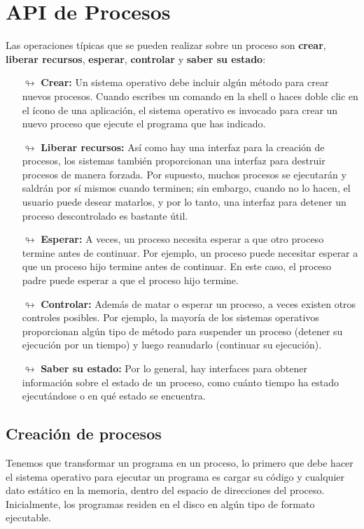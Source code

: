 \documentclass{article}
\begin{document}
\section{API de Procesos}
Las operaciones típicas que se pueden realizar sobre un proceso son \textbf{crear}, \textbf{liberar recursos}, \textbf{esperar}, \textbf{controlar} y \textbf{saber su estado}:
\begin{itemize}
    \item[$\looparrowright$] \textbf{Crear:} Un sistema operativo debe incluir algún método para crear nuevos procesos. Cuando escribes un comando en la shell o haces doble clic en el ícono de una aplicación, el sistema operativo es invocado para crear un nuevo proceso que ejecute el programa que has indicado.
    \item[$\looparrowright$] \textbf{Liberar recursos:} Así como hay una interfaz para la creación de procesos, los sistemas también proporcionan una interfaz para destruir procesos de manera forzada. Por supuesto, muchos procesos se ejecutarán y saldrán por sí mismos cuando terminen; sin embargo, cuando no lo hacen, el usuario puede desear matarlos, y por lo tanto, una interfaz para detener un proceso descontrolado es bastante útil.
    \item[$\looparrowright$] \textbf{Esperar:} A veces, un proceso necesita esperar a que otro proceso termine antes de continuar. Por ejemplo, un proceso puede necesitar esperar a que un proceso hijo termine antes de continuar. En este caso, el proceso padre puede esperar a que el proceso hijo termine.
    \item[$\looparrowright$] \textbf{Controlar:} Además de matar o esperar un proceso, a veces existen otros controles posibles. Por ejemplo, la mayoría de los sistemas operativos proporcionan algún tipo de método para suspender un proceso (detener su ejecución por un tiempo) y luego reanudarlo (continuar su ejecución).
    \item[$\looparrowright$] \textbf{Saber su estado:} Por lo general, hay interfaces para obtener información sobre el estado de un proceso, como cuánto tiempo ha estado ejecutándose o en qué estado se encuentra.
\end{itemize}
\subsection{Creación de procesos}
Tenemos que transformar un programa en un proceso, lo primero que debe hacer el sistema operativo para ejecutar un programa es cargar su código y cualquier dato estático en la memoria, dentro del espacio de direcciones del proceso. Inicialmente, los programas residen en el disco en algún tipo de formato ejecutable.
\end{document}
